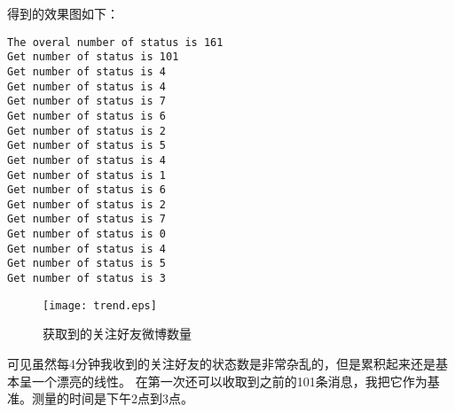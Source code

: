 \documentclass{article}
\begin{document}
得到的效果图如下：
\begin{lstlisting}
The overal number of status is 161
Get number of status is 101
Get number of status is 4
Get number of status is 4
Get number of status is 7
Get number of status is 6
Get number of status is 2
Get number of status is 5
Get number of status is 4
Get number of status is 1
Get number of status is 6
Get number of status is 2
Get number of status is 7
Get number of status is 0
Get number of status is 4
Get number of status is 5
Get number of status is 3
\end{lstlisting}
\begin{figure}[htb]
\centering
\texttt{[image: trend.eps]}
\caption{获取到的关注好友微博数量}
\end{figure}
可见虽然每4分钟我收到的关注好友的状态数是非常杂乱的，但是累积起来还是基本呈一个漂亮的线性。
在第一次还可以收取到之前的101条消息，我把它作为基准。测量的时间是下午2点到3点。
\end{document}
